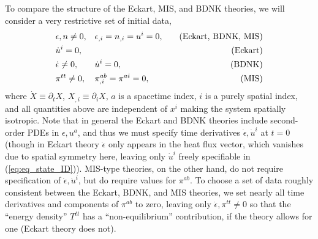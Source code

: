 \documentclass[%
notitlepage,
superscriptaddress,
nofootinbib,
amsmath,
amssymb,
aps,
twocolumn
]{revtex4-1}
\begin{document}
To compare the structure of the Eckart, MIS, and BDNK theories, we will
consider a very restrictive set of initial data,
\begin{equation} \label{eq:eq_state_ID}
\begin{aligned}
&\epsilon, n \neq 0, &&\epsilon_{,i} = n_{,i} = u^{i} = 0, &&&\textnormal{(Eckart, BDNK, MIS)} \\
&\dot{u}^{i} = 0, &&\, &&&\textnormal{(Eckart)} \\
&\dot{\epsilon} \neq 0, &&\dot{u}^{i} = 0, &&&\textnormal{(BDNK)} \\
&\pi^{tt} \neq 0, &&\pi^{ab}_{,i} = \pi^{ai} = 0, &&&\textnormal{(MIS)}
\end{aligned}
\end{equation}
where $\dot{X} \equiv \partial_{t} X$, $X_{,i} \equiv \partial_{i} X$, $a$
is a spacetime index, $i$ is a purely spatial index, and all quantities
above are independent of $x^{i}$ making the system spatially isotropic.
Note that in general the Eckart and BDNK theories include second-order PDEs in
$\epsilon, u^{a}$, and thus we must specify time derivatives
$\dot{\epsilon}, \dot{u}^{i}$ at $t = 0$ (though in Eckart theory $\dot{\epsilon}$ only appears in the heat flux vector, which vanishes due to spatial symmetry here, leaving only $\dot{u}^{i}$ freely specifiable in (\ref{eq:eq_state_ID})).  MIS-type theories, on the other
hand, do not require specification of $\dot{\epsilon}, \dot{u}^{i}$, but do
require values for $\pi^{ab}$. To choose a set of data roughly consistent
between the Eckart, BDNK, and MIS theories, we set nearly all time
derivatives and components of $\pi^{ab}$ to zero, leaving only
$\dot{\epsilon}, \pi^{tt} \neq 0$ so that the ``energy density'' $T^{tt}$
has a ``non-equilibrium'' contribution, if the theory allows for one
(Eckart theory does not). 
\end{document}
